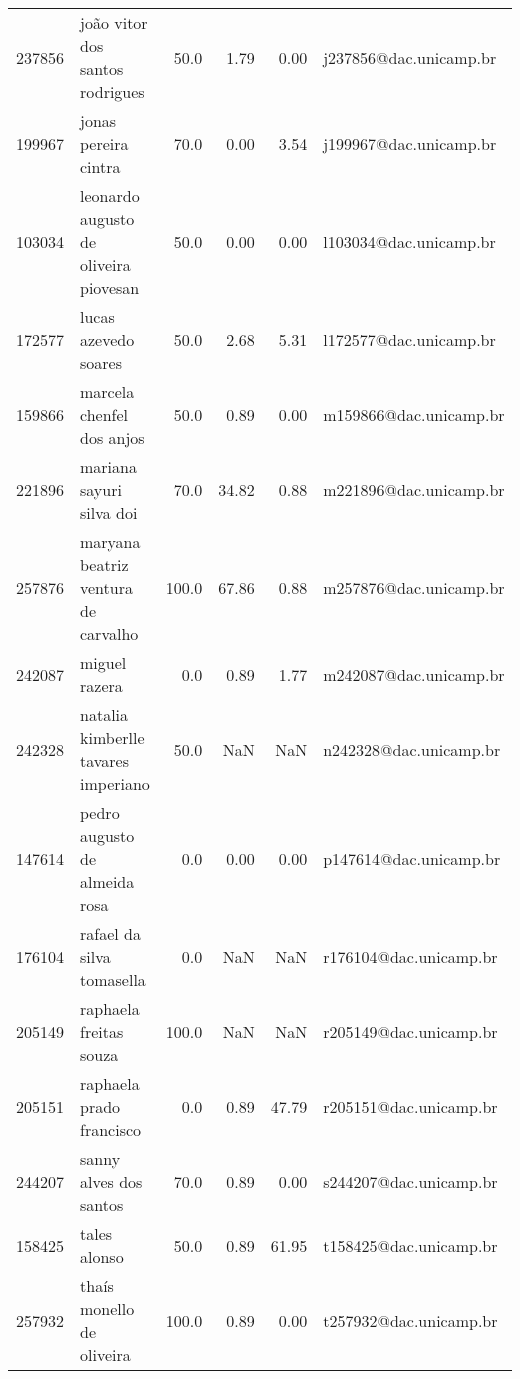 \documentclass[11pt]{article}
\begin{document}
{\begin{landscape}
\begin{longtable}{llrrrl}
237856 &        joão vitor dos santos rodrigues &                  50.0 &        1.79 &        0.00 &  j237856@dac.unicamp.br \\
199967 &                   jonas pereira cintra &                  70.0 &        0.00 &        3.54 &  j199967@dac.unicamp.br \\
103034 &  leonardo augusto de oliveira piovesan &                  50.0 &        0.00 &        0.00 &  l103034@dac.unicamp.br \\
172577 &                   lucas azevedo soares &                  50.0 &        2.68 &        5.31 &  l172577@dac.unicamp.br \\
159866 &              marcela chenfel dos anjos &                  50.0 &        0.89 &        0.00 &  m159866@dac.unicamp.br \\
221896 &               mariana sayuri silva doi &                  70.0 &       34.82 &        0.88 &  m221896@dac.unicamp.br \\
257876 &    maryana beatriz ventura de carvalho &                 100.0 &       67.86 &        0.88 &  m257876@dac.unicamp.br \\
242087 &                          miguel razera &                   0.0 &        0.89 &        1.77 &  m242087@dac.unicamp.br \\
242328 &    natalia kimberlle tavares imperiano &                  50.0 &         NaN &         NaN &  n242328@dac.unicamp.br \\
147614 &          pedro augusto de almeida rosa &                   0.0 &        0.00 &        0.00 &  p147614@dac.unicamp.br \\
176104 &              rafael da silva tomasella &                   0.0 &         NaN &         NaN &  r176104@dac.unicamp.br \\
205149 &                 raphaela freitas souza &                 100.0 &         NaN &         NaN &  r205149@dac.unicamp.br \\
205151 &               raphaela prado francisco &                   0.0 &        0.89 &       47.79 &  r205151@dac.unicamp.br \\
244207 &                 sanny alves dos santos &                  70.0 &        0.89 &        0.00 &  s244207@dac.unicamp.br \\
158425 &                           tales alonso &                  50.0 &        0.89 &       61.95 &  t158425@dac.unicamp.br \\
257932 &              thaís monello de oliveira &                 100.0 &        0.89 &        0.00 &  t257932@dac.unicamp.br \\

\end{longtable}
\end{landscape}}
\end{document}

